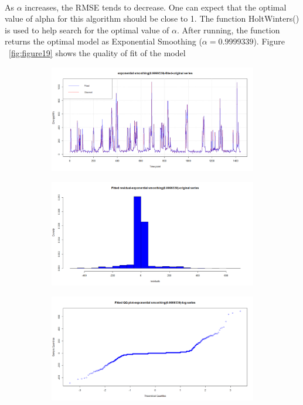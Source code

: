 \documentclass[12pt]{article}
\begin{document}
\paragraph{}
As $\alpha$ increases, the RMSE tends to decrease. One can expect that the optimal value of alpha for this algorithm should be close to 1. The function HoltWinters() is used to help search for the optimal value of $\alpha$. After running, the function returns the optimal model as Exponential Smoothing ($\alpha=0.9999339$). Figure ~\ref{fig:figure19} shows the quality of fit of the model 
\begin{figure}[H]
  \centering
  \begin{subfigure}[b]{0.6\linewidth}
    \includegraphics[width=\linewidth]{figure19-1.png}
  \end{subfigure}
  \begin{subfigure}[b]{0.6\linewidth}
    \includegraphics[width=\linewidth]{figure19-2.png}
  \end{subfigure}
  \begin{subfigure}[b]{0.6\linewidth}
    \includegraphics[width=\linewidth]{figure19-3.png}

\end{subfigure}
\end{figure}
\end{document}
